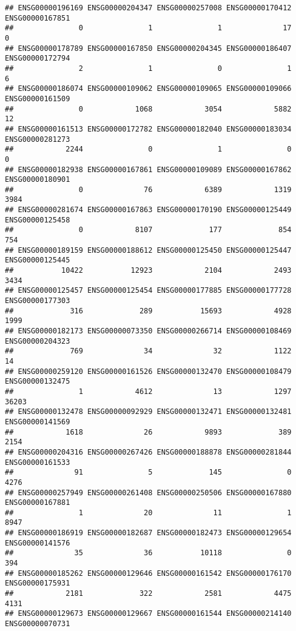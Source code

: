 \documentclass[
]{article}
\begin{document}
\begin{verbatim}
## ENSG00000196169 ENSG00000204347 ENSG00000257008 ENSG00000170412 ENSG00000167851 
##               0               1               1              17               0 
## ENSG00000178789 ENSG00000167850 ENSG00000204345 ENSG00000186407 ENSG00000172794 
##               2               1               0               1               6 
## ENSG00000186074 ENSG00000109062 ENSG00000109065 ENSG00000109066 ENSG00000161509 
##               0            1068            3054            5882              12 
## ENSG00000161513 ENSG00000172782 ENSG00000182040 ENSG00000183034 ENSG00000281273 
##            2244               0               1               0               0 
## ENSG00000182938 ENSG00000167861 ENSG00000109089 ENSG00000167862 ENSG00000180901 
##               0              76            6389            1319            3984 
## ENSG00000281674 ENSG00000167863 ENSG00000170190 ENSG00000125449 ENSG00000125458 
##               0            8107             177             854             754 
## ENSG00000189159 ENSG00000188612 ENSG00000125450 ENSG00000125447 ENSG00000125445 
##           10422           12923            2104            2493            3434 
## ENSG00000125457 ENSG00000125454 ENSG00000177885 ENSG00000177728 ENSG00000177303 
##             316             289           15693            4928            1999 
## ENSG00000182173 ENSG00000073350 ENSG00000266714 ENSG00000108469 ENSG00000204323 
##             769              34              32            1122              14 
## ENSG00000259120 ENSG00000161526 ENSG00000132470 ENSG00000108479 ENSG00000132475 
##               1            4612              13            1297           36203 
## ENSG00000132478 ENSG00000092929 ENSG00000132471 ENSG00000132481 ENSG00000141569 
##            1618              26            9893             389            2154 
## ENSG00000204316 ENSG00000267426 ENSG00000188878 ENSG00000281844 ENSG00000161533 
##              91               5             145               0            4276 
## ENSG00000257949 ENSG00000261408 ENSG00000250506 ENSG00000167880 ENSG00000167881 
##               1              20              11               1            8947 
## ENSG00000186919 ENSG00000182687 ENSG00000182473 ENSG00000129654 ENSG00000141576 
##              35              36           10118               0             394 
## ENSG00000185262 ENSG00000129646 ENSG00000161542 ENSG00000176170 ENSG00000175931 
##            2181             322            2581            4475            4131 
## ENSG00000129673 ENSG00000129667 ENSG00000161544 ENSG00000214140 ENSG00000070731 

\end{verbatim}
\end{document}
